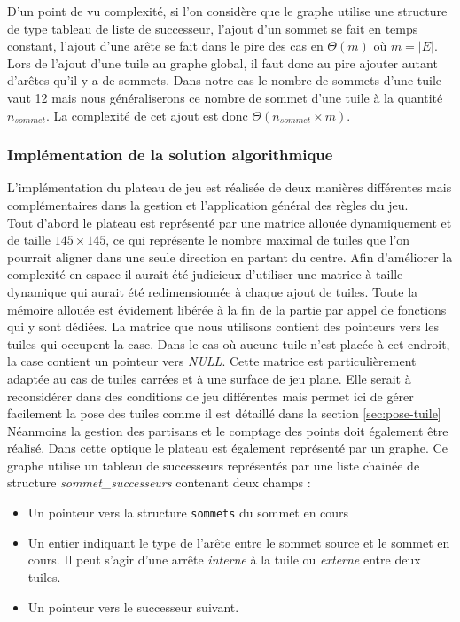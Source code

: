 \documentclass[a4paper, 11pt]{article}
\begin{document}
			 \indent D'un point de vu complexité, si l'on considère que le graphe utilise une structure de type tableau de liste de successeur, l'ajout d'un sommet se fait en temps constant, l'ajout d'une arête se fait dans le pire des cas en $\Theta(m)$ où $m = |E|$. \\
			\indent Lors de l'ajout d'une tuile au graphe global, il faut donc au pire ajouter autant d'arêtes qu'il y a de sommets. Dans notre cas le nombre de sommets d'une tuile vaut 12 mais nous généraliserons ce nombre de sommet d'une tuile à la quantité $n_{sommet}$. La complexité de cet ajout est donc $\Theta(n_{sommet}\times m)$. 

		\subsubsection{Implémentation de la solution algorithmique}\label{sec:plateau-c} 
			\indent L'implémentation du plateau de jeu est réalisée de deux manières différentes mais complémentaires dans la gestion et l'application général des règles du jeu. \\
			\indent Tout d'abord le plateau est représenté par une matrice allouée dynamiquement et de taille $145\times 145$, ce qui représente le nombre maximal de tuiles que l'on pourrait aligner dans une seule direction en partant du centre. Afin d'améliorer la complexité en espace il aurait été judicieux d'utiliser une matrice à taille dynamique qui aurait été redimensionnée à chaque ajout de tuiles. Toute la mémoire allouée est évidement libérée à la fin de la partie par appel de fonctions qui y sont dédiées.
			La matrice que nous utilisons contient des pointeurs vers les tuiles qui occupent la case. Dans le cas où aucune tuile n'est placée à cet endroit, la case contient un pointeur vers \emph{NULL}. Cette matrice est particulièrement adaptée au cas de tuiles carrées et à une surface de jeu plane. Elle serait à reconsidérer dans des conditions de jeu différentes mais permet ici de gérer facilement la pose des tuiles comme il est détaillé dans la section \ref{sec:pose-tuile} \\
			\indent Néanmoins la gestion des partisans et le comptage des points doit également être réalisé. Dans cette optique le plateau est également représenté par un graphe. Ce graphe utilise un tableau de successeurs représentés par une liste chainée de structure \emph{sommet\_successeurs} contenant deux champs : 
			\begin{itemize}
				\item Un pointeur vers la structure \verb!sommets! du sommet en cours
				\item Un entier indiquant le type de l'arête entre le sommet source et le sommet en cours. Il peut s'agir d'une arrête \emph{interne} à la tuile ou \emph{externe} entre deux tuiles.
				\item Un pointeur vers le successeur suivant.
			\end{itemize}
\end{document}
